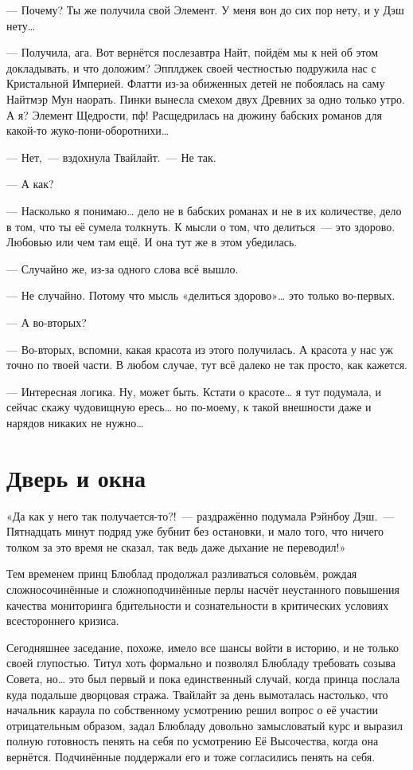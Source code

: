 \documentclass[twoside,a5paper,12pt]{extbook}
\begin{document}
— Почему? Ты же получила свой Элемент. У меня вон до сих пор нету, и у Дэш нету…

— Получила, ага. Вот вернётся послезавтра Найт, пойдём мы к ней об этом докладывать, и что доложим? Эпплджек своей честностью подружила нас с Кристальной Империей. Флатти из-за обиженных детей не побоялась на саму Найтмэр Мун наорать. Пинки вынесла смехом двух Древних за одно только утро. А я? Элемент Щедрости, пф! Расщедрилась на дюжину бабских романов для какой-то жуко-пони-оборотнихи…

— Нет, — вздохнула Твайлайт. — Не так.

— А как?

— Насколько я понимаю… дело не в бабских романах и не в их количестве, дело в том, что ты её сумела толкнуть. К мысли о том, что делиться — это здорово. Любовью или чем там ещё. И она тут же в этом убедилась.

— Случайно же, из-за одного слова всё вышло.

— Не случайно. Потому что мысль «делиться здорово»… это только во-первых.

— А во-вторых?

— Во-вторых, вспомни, какая красота из этого получилась. А красота у нас уж точно по твоей части. В любом случае, тут всё далеко не так просто, как кажется.

— Интересная логика. Ну, может быть. Кстати о красоте… я тут подумала, и сейчас скажу чудовищную ересь… но по-моему, к такой внешности даже и нарядов никаких не нужно…

\chapter{Дверь и окна}

«Да как у него так получается-то?! — раздражённо подумала Рэйнбоу Дэш. — Пятнадцать минут подряд уже бубнит без остановки, и мало того, что ничего толком за это время не сказал, так ведь даже дыхание не переводил!»

Тем временем принц Блюблад продолжал разливаться соловьём, рождая сложносочинённые и сложноподчинённые перлы насчёт неустанного повышения качества мониторинга бдительности и сознательности в критических условиях всестороннего кризиса.

Сегодняшнее заседание, похоже, имело все шансы войти в историю, и не только своей глупостью. Титул хоть формально и позволял Блюбладу требовать созыва Совета, но… это был первый и пока единственный случай, когда принца послала куда подальше дворцовая стража. Твайлайт за день вымоталась настолько, что начальник караула по собственному усмотрению решил вопрос о её участии отрицательным образом, задал Блюбладу довольно замысловатый курс и выразил полную готовность пенять на себя по усмотрению Её Высочества, когда она вернётся. Подчинённые поддержали его и тоже согласились пенять на себя.
\end{document}
